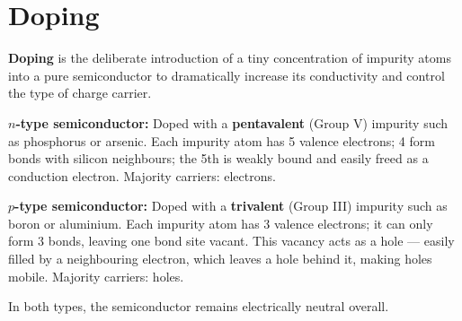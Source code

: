 \section{Doping}

\begin{definitionbox}
\textbf{Doping} is the deliberate introduction of
a tiny concentration of impurity atoms into a
pure semiconductor to dramatically increase its
conductivity and control the type of charge carrier.

\textbf{$n$-type semiconductor:} Doped with a
\textbf{pentavalent} (Group V) impurity such as
phosphorus or arsenic. Each impurity atom has 5
valence electrons; 4 form bonds with silicon
neighbours; the 5th is weakly bound and easily
freed as a conduction electron. Majority carriers:
electrons.

\textbf{$p$-type semiconductor:} Doped with a
\textbf{trivalent} (Group III) impurity such as
boron or aluminium. Each impurity atom has 3
valence electrons; it can only form 3 bonds,
leaving one bond site vacant. This vacancy acts
as a hole --- easily filled by a neighbouring
electron, which leaves a hole behind it, making
holes mobile. Majority carriers: holes.

In both types, the semiconductor remains
electrically neutral overall.
\end{definitionbox}

